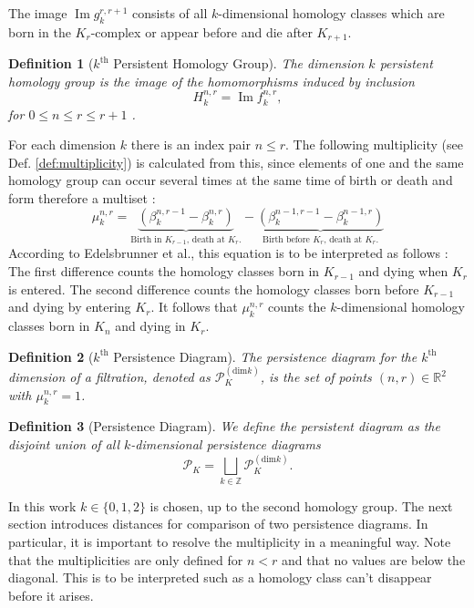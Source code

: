 \documentclass[journal]{IEEEtran}
\DeclareMathOperator{\Ima}{Im}
\newtheorem{definition}{Definition}[section]
\begin{document}
The image $\Ima g^{r,r+1}_k$ consists of all $k$-dimensional homology classes which are born in the $K_r$-complex or appear before and die after $K_{r+1}$.

\begin{definition}[$k^{\text{th}}$ Persistent Homology Group]
The dimension $k$ persistent homology group is the image of the homomorphisms induced by inclusion
\[
H_k^{n,r} = \Ima f_k^{n,r},
\]
 for $0\leq n \leq r \leq r+1$ \cite{edelsbrunner2008persistent}.
\end{definition}

For each dimension $k$ there is an index pair $n \leq r$. The following multiplicity (see Def. \ref{def:multiplicity}) is calculated from this, since elements of one and the same homology group can occur several times at the same time of birth or death and form therefore a multiset \cite{edelsbrunner2008persistent}:
\begin{equation}
  \mu^{n,r}_k = \underbrace{(\beta_k^{n,r-1} - \beta_k^{n,r})}_{\text{Birth in $K_{r-1}$, death at $K_r$.}} - \underbrace{(\beta_k^{n-1,r-1}-\beta_k^{n-1,r})}_{\text{Birth before $K_r$, death at $K_r$.}}
\end{equation}
According to Edelsbrunner et al., this equation is to be interpreted as follows \cite{edelsbrunner2008persistent}: The first difference counts the homology classes born in $K_{r-1}$ and dying when $K_r$ is entered. The second difference counts the homology classes born before $K_{r-1}$ and dying by entering $K_r$. It follows that $\mu^{n,r}_k$ counts the $k$-dimensional homology classes born in $K_n$ and dying in $K_r$.

\begin{definition}[$k^{\text{th}}$ Persistence Diagram]
\label{kpersist}
The persistence diagram for the $k^{\text{th}}$ dimension of a filtration, denoted as $\mathcal{P}^{(\text{dim} k)}_{K}$, is the set of points $(n,r) \in \mathbb{R}^2$ with $\mu^{n,r}_k = 1$.
\end{definition}

\begin{definition}[Persistence Diagram]
We define the persistent diagram as the disjoint union of all $k$-dimensional persistence diagrams
\begin{equation}
\mathcal{P}_K = \bigsqcup_{k \in \mathbb{Z}} \mathcal{P}^{(\text{dim} k)}_{K}.
\end{equation}
\end{definition}

In this work $k \in \{0,1,2\}$ is chosen, up to the second homology group. The next section introduces distances for comparison of two persistence diagrams. In particular, it is important to resolve the multiplicity in a meaningful way. Note that the multiplicities are only defined for $n < r$ and that no values are below the diagonal. This is to be interpreted such as a homology class can't disappear before it arises.
\end{document}

